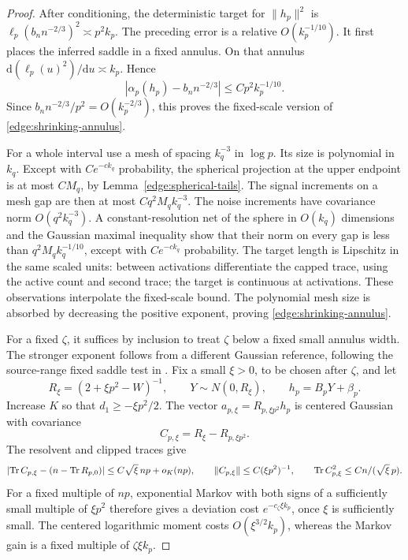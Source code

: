 \begin{proof}
After conditioning, the deterministic target for \(\|h_p\|^2\) is
\(\ell_p(b_nn^{-2/3})^2\asymp p^2k_p\).  The preceding error is a
relative \(O(k_p^{-1/10})\).  It first places the inferred saddle in
a fixed annulus.  On that annulus
\(\mathrm d(\ell_p(u)^2)/\mathrm du\asymp k_p\).  Hence
\[
 |\alpha_p(h_p)-b_nn^{-2/3}|\le Cp^2k_p^{-1/10}.
\]
Since \(b_nn^{-2/3}/p^2=O(k_p^{-2/3})\), this proves the fixed-scale
version of \eqref{edge:shrinking-annulus}.

For a whole interval use a mesh of spacing \(k_q^{-3}\) in \(\log p\).
Its size is polynomial in \(k_q\).  Except with \(Ce^{-ck_q}\)
probability, the spherical projection at the upper endpoint is at most
\(CM_q\), by Lemma~\ref{edge:spherical-tails}.  The signal increments
on a mesh gap are then at most \(Cq^2M_qk_q^{-3}\).
The noise increments have covariance norm \(O(q^2k_q^{-3})\).
A constant-resolution net of the sphere in \(O(k_q)\) dimensions and
the Gaussian maximal inequality show that their norm on every gap is
less than \(q^2M_qk_q^{-1/10}\), except with \(Ce^{-ck_q}\)
probability.  The target length is Lipschitz in the same scaled units:
between activations differentiate the capped trace, using the active
count and second trace; the target is continuous at activations.
These observations interpolate the fixed-scale bound.  The polynomial
mesh size is absorbed by decreasing the positive exponent, proving
\eqref{edge:shrinking-annulus}.

For a fixed \(\zeta\), it suffices by inclusion to treat \(\zeta\)
below a fixed small annulus width.  The stronger exponent follows from a
different Gaussian reference, following the source-range fixed saddle
test in \cite[Section~19.2, Equation~(19.9) and its proof]{CM}.
Fix a small \(\xi>0\), to be chosen after \(\zeta\), and let
\[
 R_\xi=(2+\xi p^2-W)^{-1},\qquad
 Y\sim N(0,R_\xi),\qquad h_p=B_pY+\beta_p .
\]
Increase \(K\) so that \(d_1\ge-\xi p^2/2\).
The vector \(a_{p,\xi}=R_{p,\xi p^2}h_p\) is centered Gaussian with
covariance
\[
 C_{p,\xi}=R_\xi-R_{p,\xi p^2}.
\]
The resolvent and clipped traces give
\[
 \left|\operatorname{Tr} C_{p,\xi}-(n-\operatorname{Tr} R_{p,0})\right|
       \le C\sqrt\xi\,np+o_K(np),\qquad
 \|C_{p,\xi}\|\le C(\xi p^2)^{-1},\qquad
 \operatorname{Tr} C_{p,\xi}^2\le Cn/(\sqrt\xi\,p).
\]
For a fixed multiple of \(np\), exponential Markov with both signs
of a sufficiently small multiple of \(\xi p^2\) therefore gives
a deviation cost \(e^{-c_\zeta\xi k_p}\), once \(\xi\) is sufficiently
small.  The centered logarithmic moment costs \(O(\xi^{3/2}k_p)\),
whereas the Markov gain is a fixed multiple of \(\zeta\xi k_p\).


\end{proof}

